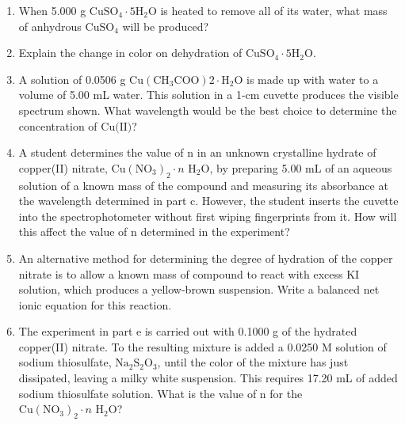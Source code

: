 \documentclass[10pt,a4paper]{article}
\begin{document}
\begin{enumerate}[label=\alph*.]
    \vspace{5cm} \item When 5.000 g $\text{CuSO}_4\cdot5\text{H}_2\text{O}$ is heated to remove all of its water, what mass of anhydrous $\text{CuSO}_4$ will be produced?
    \vspace{5cm} \item Explain the change in color on dehydration of $\text{CuSO}_4\cdot5\text{H}_2\text{O}$.
    \vspace{5cm} \item A solution of 0.0506 g $\text{Cu}(\text{CH}_3\text{COO})2\cdot\text{H}_2\text{O}$ is made up with water to a volume of 5.00 mL water. This solution in a 1-cm cuvette produces the visible spectrum shown. What wavelength would be the best choice to determine the concentration of $\text{Cu(II)}$?
    
    \begin{center}
    \end{center}

    \vspace{5cm} \item A student determines the value of n in an unknown crystalline hydrate of copper(II) nitrate, $\text{Cu}(\text{NO}_3)_2\cdot n\text{ H}_2\text{O}$, by preparing 5.00 mL of an aqueous solution of a known mass of the compound and measuring its absorbance at the wavelength determined in part c. However, the student inserts the cuvette into the spectrophotometer without first wiping fingerprints from it. How will this affect the value of n determined in the experiment?
    \vspace{5cm} \item An alternative method for determining the degree of hydration of the copper nitrate is to allow a known mass of compound to react with excess KI solution, which produces a yellow-brown suspension. Write a balanced net ionic equation for this reaction.
    \vspace{5cm} \item The experiment in part e is carried out with 0.1000 g of the hydrated copper(II) nitrate. To the resulting mixture is added a 0.0250 M solution of sodium thiosulfate, $\text{Na}_2\text{S}_2\text{O}_3$, until the color of the mixture has just dissipated, leaving a milky white suspension. This requires 17.20 mL of added sodium thiosulfate solution. What is the value of n for the $\text{Cu}(\text{NO}_3)_2\cdot n\text{ H}_2\text{O}$?
\end{enumerate}
\end{document}
